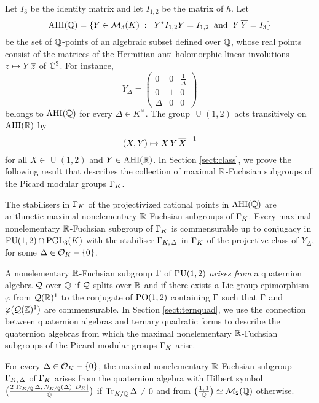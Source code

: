 \documentclass[11pt]{article}
\begin{document}
 

 
Let $I_3$ be the identity matrix and let $I_{1,2}$ be the matrix of $h$. Let
$$
\operatorname{AHI}({\mathbb Q})=\{Y\in{\cal M}_3(K)\;:\;\; 
Y^*I_{1,2}Y=I_{1,2} \;\;{\rm and}\;\;Y\,{\overline{Y}}=I_3\}
$$ 
be the set of ${\mathbb Q}$-points of an algebraic subset defined over
${\mathbb Q}$, whose real points consist of the matrices of the Hermitian
anti-holomorphic linear involutions $z\mapsto Y\,{\overline{z}}$ of
${\mathbb C}^3$. For instance,
$$
Y_\Delta=\begin{pmatrix} 0 & 0 & \frac{1}{\overline{\Delta}}\\ 0 & 1 &
0 \\ \Delta & 0 & 0
\end{pmatrix}
$$  
belongs to $\operatorname{AHI}({\mathbb Q})$ for every $\Delta\in K^\times$. The group
$\operatorname{U}(1,2)$ acts transitively on $\operatorname{AHI}({\mathbb R})$ by
$$
(X,Y)\mapsto X\,Y\,{\overline{X}}^{\,-1}
$$ 
for all $X\in \operatorname{U}(1,2)$ and $Y\in\operatorname{AHI}({\mathbb R})$.  In Section
\ref{sect:class}, we prove the following result that describes the
collection of maximal ${\mathbb R}$-Fuchsian subgroups of the Picard modular
groups $\Gamma_K$.

\btheo\label{theo:classification} The stabilisers in $\Gamma_K$ of the
projectivized rational points in $\operatorname{AHI}({\mathbb Q})$ are arithmetic maximal
nonelementary ${\mathbb R}$-Fuchsian subgroups of $\Gamma_K$.  Every maximal
nonelementary ${\mathbb R}$-Fuchsian subgroup of $\Gamma_K$ is commensurable up
to conjugacy in $\operatorname{PU}(1,2)\cap\operatorname{PGL}_3(K)$ with the stabiliser
$\Gamma_{K,\,\Delta}$ in $\Gamma_K$ of the projective class of $Y_\Delta$,
for some $\Delta\in{\cal O}_K-\{0\}$.  
\etheo


A nonelementary ${\mathbb R}$-Fuchsian subgroup $\Gamma$ of $\operatorname{PU}(1,2)$ {\it
  arises from} a quaternion algebra ${\cal Q}$ over ${\mathbb Q}$ if ${\cal Q}$ splits
over ${\mathbb R}$ and if there exists a Lie group epimorphism $\varphi$ from
${\cal Q}({\mathbb R})^1$ to the conjugate of $\operatorname{PO}(1,2)$ containing $\Gamma$ such that
$\Gamma$ and $\varphi({\cal Q}({\mathbb Z})^1)$ are commensurable.  In Section
\ref{sect:ternquad}, we use the connection between quaternion algebras
and ternary quadratic forms to describe the quaternion algebras from
which the maximal nonelementary ${\mathbb R}$-Fuchsian subgroups of the Picard
modular groups $\Gamma_K$ arise.

\btheo \label{theo:main} 
For every $\Delta\in {\cal O}_K-\{0\}$, the maximal nonelementary
${\mathbb R}$-Fuchsian subgroup $\Gamma_{K,\,\Delta}$ of $\Gamma_K$ arises from the
quaternion algebra with Hilbert symbol 
$\big(\frac{2 \operatorname{Tr}_{K/{\mathbb Q}}\Delta
  ,\, N_{K/{\mathbb Q}}(\Delta) \,|D_K|}{{\mathbb Q}}\big)$ if $\operatorname{Tr}_{K/{\mathbb Q}}\Delta\ne 0$
and from $\big(\frac{1,\,1}{{\mathbb Q}}\big)\simeq {\cal M}_2({\mathbb Q})$ otherwise.
\etheo
\end{document}
